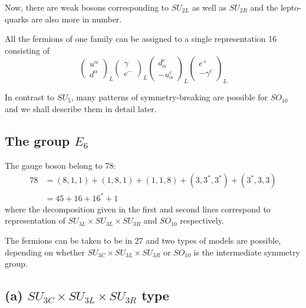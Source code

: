 Now, there are weak bosons corresponding to $SU_{2L}$ as well as $SU_{2R}$ and the lepto-quarks are also more in number.

All the fermions of one family can be assigned to a single representation 16 consisting of
\begin{equation*}
\begin{pmatrix}
u^{\alpha} \\
d^{\alpha}
\end{pmatrix}_{L}
\begin{pmatrix}
\gamma \\
e^{-}
\end{pmatrix}_{L}
\begin{pmatrix}
d^{c}_{\alpha}\\
-u^{c}_{\alpha}
\end{pmatrix}_{L}
\begin{pmatrix}
e^{+}\\
-\gamma^{c}
\end{pmatrix}_{L}
\end{equation*}

In contrast to $SU_{5}$, many patterns of symmetry-breaking are possible for $SO_{10}$ and we shall describe them in detail later.

\subsection{The group $E_{6}$}

The gauge boson belong to 78:
\begin{align*}
78 &= (8,1,1) + (1,8,1) + (1,1,8) + (3,3^{*}, 3^{*}) + (3^{*}, 3, 3)\\
   &= 45 + 16 + 16^{*} + 1 
\end{align*}
where the decomposition given in the first and second lines correspond to representation of $SU_{3L} \times SU_{3L} \times SU_{3R}$ and $SO_{10}$ respectively.

The fermions can be taken to be in 27 and two types of models are possible, depending on whether $SU_{3C} \times SU_{3L} \times SU_{3R}$ or $SO_{10}$ is the intermediate symmetry group.

\subsection*{(a) $SU_{3C} \times SU_{3L} \times SU_{3R}$ type}

